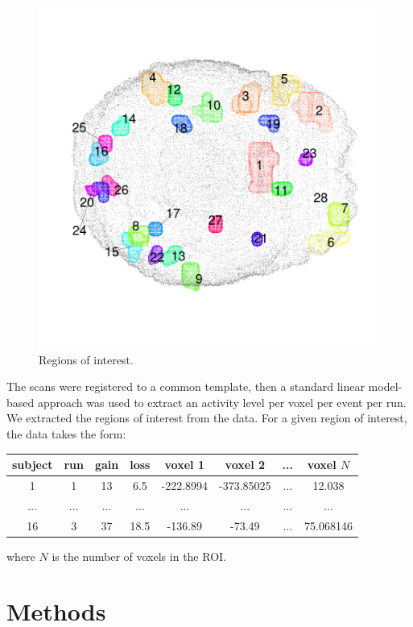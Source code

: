 \documentclass[12pt]{article}
\begin{document}
\begin{figure}[h]
\includegraphics[scale = 0.1]{../a7plots/all_rois_view3.png}
\caption{Regions of interest.}
\end{figure}

The scans were registered to a common template, then a standard linear model-based approach
was used to extract an activity level per voxel per event per run.
We extracted the regions of interest from the data.  For a given region of interest, the data takes the form:

\begin{tabular}{|c|c|c|c||c|c|c|c|}
\hline
subject & run & gain & loss & voxel 1 & voxel 2 & ... & voxel $N$ \\
\hline
 1 & 1 & 13 &  6.5 & -222.8994 &  -373.85025 & ... & 12.038\\
... & ... & ... & ... & ... & ... & ... & ...\\
16 & 3 & 37 & 18.5 & -136.89 & -73.49 & ... & 75.068146 \\
\hline
\end{tabular}

where $N$ is the number of voxels in the ROI.

\section{Methods}
\end{document}
